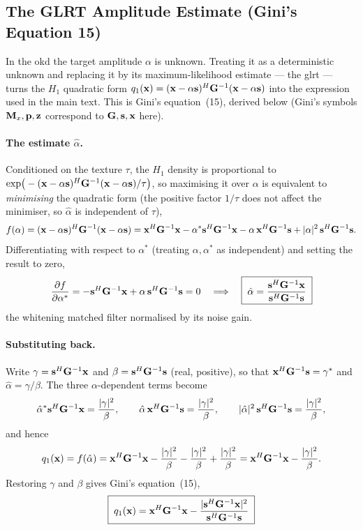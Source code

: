 \documentclass{article}
\begin{document}
\subsection{The GLRT Amplitude Estimate (Gini's Equation 15)}
\label{app:okd-glrt}
In the \gls{okd} the target amplitude $\alpha$ is unknown. Treating it as a deterministic unknown and replacing it by its maximum-likelihood estimate --- the \gls{glrt} --- turns the $H_1$ quadratic form $q_1(\vb x)=(\vb x-\alpha\vb s)^H\mathbf{G}^{-1}(\vb x-\alpha\vb s)$ into the expression used in the main text. This is Gini's equation~(15), derived below (Gini's symbols $\mathbf{M}_x,\vb p,\vb z$ correspond to $\mathbf{G},\vb s,\vb x$ here).

\paragraph{The estimate $\hat\alpha$.}
Conditioned on the texture $\tau$, the $H_1$ density is proportional to $\exp\!\big(-(\vb x-\alpha\vb s)^H\mathbf{G}^{-1}(\vb x-\alpha\vb s)/\tau\big)$, so maximising it over $\alpha$ is equivalent to \emph{minimising} the quadratic form (the positive factor $1/\tau$ does not affect the minimiser, so $\hat\alpha$ is independent of $\tau$),
$$f(\alpha)=(\vb x-\alpha\vb s)^H\mathbf{G}^{-1}(\vb x-\alpha\vb s)=\vb x^H\mathbf{G}^{-1}\vb x-\alpha^{*}\vb s^H\mathbf{G}^{-1}\vb x-\alpha\,\vb x^H\mathbf{G}^{-1}\vb s+|\alpha|^2\,\vb s^H\mathbf{G}^{-1}\vb s.$$
Differentiating with respect to $\alpha^{*}$ (treating $\alpha,\alpha^{*}$ as independent) and setting the result to zero,
$$\frac{\partial f}{\partial\alpha^{*}}=-\vb s^H\mathbf{G}^{-1}\vb x+\alpha\,\vb s^H\mathbf{G}^{-1}\vb s=0\quad\Longrightarrow\quad\boxed{\;\hat\alpha=\frac{\vb s^H\mathbf{G}^{-1}\vb x}{\vb s^H\mathbf{G}^{-1}\vb s}\;}$$
the whitening matched filter normalised by its noise gain.

\paragraph{Substituting back.}
Write $\gamma=\vb s^H\mathbf{G}^{-1}\vb x$ and $\beta=\vb s^H\mathbf{G}^{-1}\vb s$ (real, positive), so that $\vb x^H\mathbf{G}^{-1}\vb s=\gamma^{*}$ and $\hat\alpha=\gamma/\beta$. The three $\alpha$-dependent terms become
$$\hat\alpha^{*}\vb s^H\mathbf{G}^{-1}\vb x=\frac{|\gamma|^2}{\beta},\qquad\hat\alpha\,\vb x^H\mathbf{G}^{-1}\vb s=\frac{|\gamma|^2}{\beta},\qquad|\hat\alpha|^2\,\vb s^H\mathbf{G}^{-1}\vb s=\frac{|\gamma|^2}{\beta},$$
and hence
$$q_1(\vb x)=f(\hat\alpha)=\vb x^H\mathbf{G}^{-1}\vb x-\frac{|\gamma|^2}{\beta}-\frac{|\gamma|^2}{\beta}+\frac{|\gamma|^2}{\beta}=\vb x^H\mathbf{G}^{-1}\vb x-\frac{|\gamma|^2}{\beta}.$$
Restoring $\gamma$ and $\beta$ gives Gini's equation~(15),
$$\boxed{\;q_1(\vb x)=\vb x^H\mathbf{G}^{-1}\vb x-\frac{|\vb s^H\mathbf{G}^{-1}\vb x|^2}{\vb s^H\mathbf{G}^{-1}\vb s}\;}$$
\end{document}
